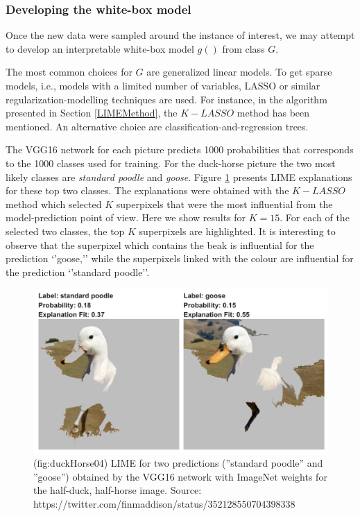 \documentclass[12pt,]{krantz}
\begin{document}
\hypertarget{developing-the-white-box-model}{%
\subsubsection{Developing the white-box model}\label{developing-the-white-box-model}}

Once the new data were sampled around the instance of interest, we may attempt to develop an interpretable white-box model \(g()\) from class \(G\).

The most common choices for \(G\) are generalized linear models. To get sparse models, i.e., models with a limited number of variables, LASSO or similar regularization-modelling techniques are used. For instance, in the algorithm presented in Section \ref{LIMEMethod}, the \(K-LASSO\) method has been mentioned. An alternative choice are classification-and-regression trees.

The VGG16 network for each picture predicts 1000 probabilities that corresponds to the 1000 classes used for training.
For the duck-horse picture the two most likely classes are \emph{standard poodle} and \emph{goose}.
Figure \ref{fig:duckHorse04} presents LIME explanations for these top two classes. The explanations were obtained with the \(K-LASSO\) method which selected \(K\) superpixels that were the most influential from the model-prediction point of view. Here we show results for \(K=15\). For each of the selected two classes, the top \(K\) superpixels are highlighted. It is interesting to observe that the superpixel which contains the beak is influential for the prediction `'goose,'' while the superpixels linked with the colour are influential for the prediction `'standard poodle''.

\begin{figure}

{\centering \includegraphics[width=1\linewidth]{figure/duck_horse_04} 

}

\caption{(fig:duckHorse04) LIME for two predictions (''standard poodle'' and ''goose'') obtained by the VGG16 network with ImageNet weights for the half-duck, half-horse image. Source: https://twitter.com/finmaddison/status/352128550704398338}\label{fig:duckHorse04}
\end{figure}
\end{document}
